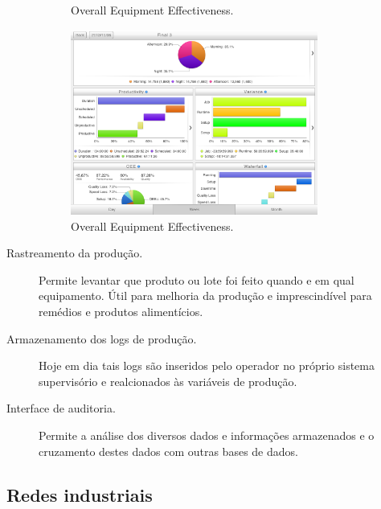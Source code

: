 \begin{description}
\begin{figure}[hbt]
\begin{center}
	\end{center}
	\caption{Overall Equipment Effectiveness.}
	\label{fig:oeeEq}
\end{figure}
\begin{figure}[hbt]
	\begin{center}
		\includegraphics[width=0.8\textwidth]{figuras/oee2}
	\end{center}
	\caption{Overall Equipment Effectiveness.}
	\label{fig:oee}
\end{figure}

	\item[Rastreamento da produção.] Permite levantar que produto ou lote foi feito quando e em qual equipamento. Útil para melhoria da produção e imprescindível para remédios e produtos alimentícios.
	\item[Armazenamento dos logs de produção.] Hoje em dia tais logs são inseridos pelo operador no próprio sistema supervisório e realcionados às variáveis de produção.
	\item[Interface de auditoria.] Permite a análise dos diversos dados e informações armazenados e o cruzamento destes dados com outras bases de dados.
\end{description}

\subsection{Redes industriais}

